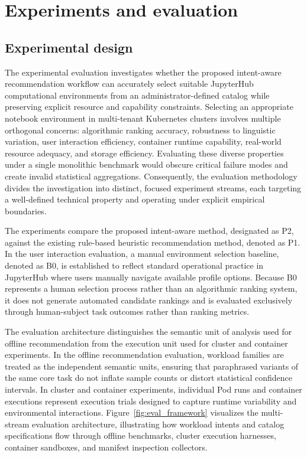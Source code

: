 \chapter{Experiments and evaluation}
\label{chap:experiments_and_evaluation}

\section{Experimental design}
\label{sec:experimental_design}

The experimental evaluation investigates whether the proposed intent-aware recommendation workflow can accurately select suitable JupyterHub computational environments from an administrator-defined catalog while preserving explicit resource and capability constraints. Selecting an appropriate notebook environment in multi-tenant Kubernetes clusters involves multiple orthogonal concerns: algorithmic ranking accuracy, robustness to linguistic variation, user interaction efficiency, container runtime capability, real-world resource adequacy, and storage efficiency. Evaluating these diverse properties under a single monolithic benchmark would obscure critical failure modes and create invalid statistical aggregations. Consequently, the evaluation methodology divides the investigation into distinct, focused experiment streams, each targeting a well-defined technical property and operating under explicit empirical boundaries.

The experiments compare the proposed intent-aware method, designated as P2, against the existing rule-based heuristic recommendation method, denoted as P1. In the user interaction evaluation, a manual environment selection baseline, denoted as B0, is established to reflect standard operational practice in JupyterHub where users manually navigate available profile options. Because B0 represents a human selection process rather than an algorithmic ranking system, it does not generate automated candidate rankings and is evaluated exclusively through human-subject task outcomes rather than ranking metrics.

The evaluation architecture distinguishes the semantic unit of analysis used for offline recommendation from the execution unit used for cluster and container experiments. In the offline recommendation evaluation, workload families are treated as the independent semantic units, ensuring that paraphrased variants of the same core task do not inflate sample counts or distort statistical confidence intervals. In cluster and container experiments, individual Pod runs and container executions represent execution trials designed to capture runtime variability and environmental interactions. Figure~\ref{fig:eval_framework} visualizes the multi-stream evaluation architecture, illustrating how workload intents and catalog specifications flow through offline benchmarks, cluster execution harnesses, container sandboxes, and manifest inspection collectors.

